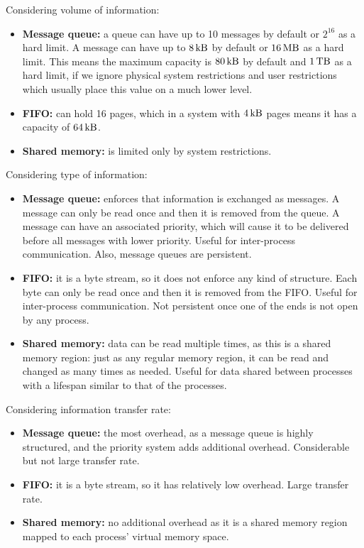 \documentclass{sope}
\begin{document}
Considering volume of information:
\begin{itemize}
    \item \textbf{Message queue:} a queue can have up to 10 messages by default or $2^{16}$ as a hard limit. A message can have up to $\SI{8}{\kilo\byte}$ by default or $\SI{16}{\mega\byte}$ as a hard limit. This means the maximum capacity is $\SI{80}{\kilo\byte}$ by default and $\SI{1}{\tera\byte}$ as a hard limit, if we ignore physical system restrictions and user restrictions which usually place this value on a much lower level.
    \item \textbf{FIFO:} can hold 16 pages, which in a system with $\SI{4}{\kilo\byte}$ pages means it has a capacity of $\SI{64}{\kilo\byte}$.
    \item \textbf{Shared memory:} is limited only by system restrictions.
\end{itemize}

Considering type of information:
\begin{itemize}
    \item \textbf{Message queue:} enforces that information is exchanged as messages. A message can only be read once and then it is removed from the queue. A message can have an associated priority, which will cause it to be delivered before all messages with lower priority. Useful for inter-process communication. Also, message queues are persistent.
    \item \textbf{FIFO:} it is a byte stream, so it does not enforce any kind of structure. Each byte can only be read once and then it is removed from the FIFO. Useful for inter-process communication. Not persistent once one of the ends is not open by any process.
    \item \textbf{Shared memory:} data can be read multiple times, as this is a shared memory region: just as any regular memory region, it can be read and changed as many times as needed. Useful for data shared between processes with a lifespan similar to that of the processes.
\end{itemize}

Considering information transfer rate:
\begin{itemize}
    \item \textbf{Message queue:} the most overhead, as a message queue is highly structured, and the priority system adds additional overhead. Considerable but not large transfer rate.
    \item \textbf{FIFO:} it is a byte stream, so it has relatively low overhead. Large transfer rate.
    \item \textbf{Shared memory:} no additional overhead as it is a shared memory region mapped to each process' virtual memory space.
\end{itemize}
\end{document}

